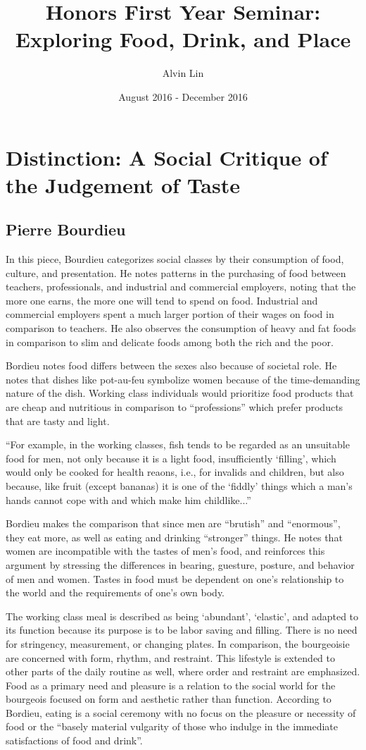 \documentclass[letterpaper, 12pt]{article}
\title{Honors First Year Seminar: Exploring Food, Drink, and Place}
\author{Alvin Lin}
\date{August 2016 - December 2016}
\begin{document}
\maketitle

\section*{Distinction: A Social Critique of the Judgement of Taste}
\subsection*{Pierre Bourdieu}
In this piece, Bourdieu categorizes social classes by their consumption of food, culture, and presentation. He notes patterns in the purchasing of food between teachers, professionals, and industrial and commercial employers, noting that the more one earns, the more one will tend to spend on food. Industrial and commercial employers spent a much larger portion of their wages on food in comparison to teachers. He also observes the consumption of heavy and fat foods in comparison to slim and delicate foods among both the rich and the poor. \par
Bordieu notes food differs between the sexes also because of societal role. He notes that dishes like pot-au-feu symbolize women because of the time-demanding nature of the dish. Working class individuals would prioritize food products that are cheap and nutritious in comparison to ``professions'' which prefer products that are tasty and light. \par
``For example, in the working classes, fish tends to be regarded as an unsuitable food for men, not only because it is a light food, insufficiently `filling', which would only be cooked for health reaons, i.e., for invalids and children, but also because, like fruit (except bananas) it is one of the `fiddly' things which a man's hands cannot cope with and which make him childlike...'' \par
Bordieu makes the comparison that since men are ``brutish'' and ``enormous'', they eat more, as well as eating and drinking ``stronger'' things. He notes that women are incompatible with the tastes of men's food, and reinforces this argument by stressing the differences in bearing, guesture, posture, and behavior of men and women. Tastes in food must be dependent on one's relationship to the world and the requirements of one's own body. \par
The working class meal is described as being `abundant', `elastic', and adapted to its function because its purpose is to be labor saving and filling. There is no need for stringency, measurement, or changing plates. In comparison, the bourgeoisie are concerned with form, rhythm, and restraint. This lifestyle is extended to other parts of the daily routine as well, where order and restraint are emphasized. Food as a primary need and pleasure is a relation to the social world for the bourgeois focused on form and aesthetic rather than function. According to Bordieu, eating is a social ceremony with no focus on the pleasure or necessity of food or the ``basely material vulgarity of those who indulge in the immediate satisfactions of food and drink''.
\end{document}
